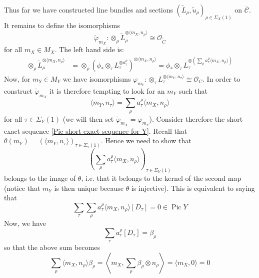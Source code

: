 \documentclass[11pt]{amsart}
\newcommand{\OO}{\mathcal{O}}
\newcommand{\Pic}{\operatorname{Pic}}
\theoremstyle{definition}
\theoremstyle{definition}
\begin{document}
Thus far we have constructed line bundles and sections $(\tilde{L}_\rho, \tilde{u}_\rho)_{\rho \in \Sigma_X(1)}$ on $\overline{\mathcal C}$. It remains to define the isomorphisms
\begin{equation*} \tilde{\varphi}_{m_X} : \otimes_\rho \tilde{L}_\rho^{\otimes \langle m_X, n_\rho \rangle} \cong \OO_{\tilde{C}} \end{equation*}
for all $m_X \in M_X$. The left hand side is:
\begin{align*} \otimes_\rho \tilde{L}_\rho^{\otimes \langle m_X, n_\rho \rangle} & = \otimes_\rho \left( \phi_* \otimes_\tau L_\tau^{\otimes a_\tau^\rho} \right)^{\otimes \langle m_X, n_\rho \rangle} = \phi_* \otimes_\tau L_\tau^{\otimes \left( \sum_{\rho} a_\tau^\rho  \langle m_X, n_\rho \rangle \right)} \end{align*}
Now, for $m_Y \in M_Y$ we have isomorphisms $\varphi_{m_Y} : \otimes_\tau L_\tau^{\otimes \langle m_Y, n_\tau \rangle} \cong \OO_{C}$. In order to construct $\tilde{\varphi}_{m_X}$ it is therefore tempting to look for an $m_Y$ such that
\begin{equation*} \langle m_Y, n_\tau \rangle = \sum_\rho a_\tau^\rho \langle m_X, n_\rho \rangle \end{equation*}
for all $\tau \in \Sigma_Y(1)$ (we will then set $\tilde{\varphi}_{m_X} = \varphi_{m_Y}$). Consider therefore the short exact sequence \eqref{Pic short exact sequence for Y}. Recall that $\theta(m_Y) = (\langle m_Y, n_\tau \rangle)_{\tau \in \Sigma_Y(1)}$. Hence we need to show that
\begin{equation*} \left( \sum_\rho a_\tau^\rho \langle m_X, n_\rho \rangle \right)_{\tau \in \Sigma_Y(1)} \end{equation*}
belongs to the image of $\theta$, i.e. that it belongs to the kernel of the second map (notice that $m_Y$ is then unique because $\theta$ is injective). This is equivalent to saying that
\begin{equation*} \sum_\tau \sum_\rho a_\tau^\rho \langle m_X, n_\rho \rangle [D_\tau] = 0 \in \Pic Y \end{equation*}
Now, we have
\begin{equation*} \sum_\tau a_\tau^\rho [D_\tau] = \beta_\rho \end{equation*}
so that the above sum becomes
\begin{equation*} \sum_\rho \langle m_X, n_\rho \rangle \beta_\rho = \left\langle m_X, \sum_\rho \beta_\rho \otimes n_\rho \right \rangle = \langle m_X, 0 \rangle = 0 \end{equation*}
\end{document}
